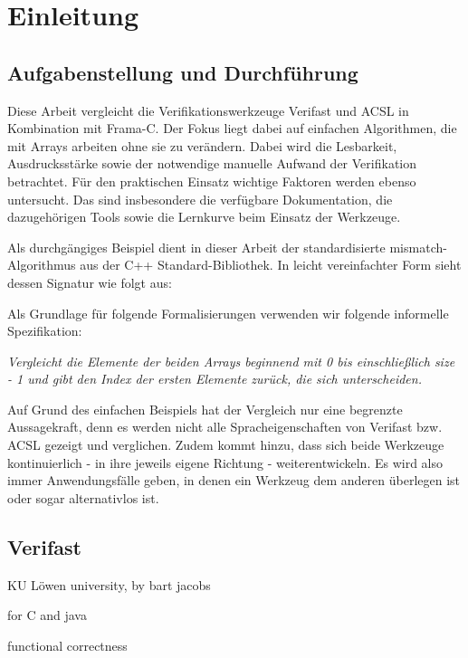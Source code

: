 ﻿\chapter{Einleitung}

\section{Aufgabenstellung und Durchführung}
Diese Arbeit vergleicht die Verifikationswerkzeuge Verifast und ACSL in Kombination mit Frama-C. 
Der Fokus liegt dabei auf einfachen Algorithmen, die mit Arrays arbeiten ohne sie zu verändern.
Dabei wird die Lesbarkeit, Ausdrucksstärke sowie der notwendige manuelle Aufwand der Verifikation betrachtet.
Für den praktischen Einsatz wichtige Faktoren werden ebenso untersucht. Das sind insbesondere die verfügbare 
Dokumentation, die dazugehörigen Tools sowie die Lernkurve beim Einsatz der Werkzeuge.

Als durchgängiges Beispiel dient in dieser Arbeit der standardisierte mismatch-Algorithmus aus
der C++ Standard-Bibliothek. In leicht vereinfachter Form sieht dessen Signatur wie folgt aus:



Als Grundlage für folgende Formalisierungen verwenden wir folgende informelle Spezifikation:

\emph{Vergleicht die Elemente der beiden Arrays beginnend mit 0 bis einschließlich size - 1 und gibt den
Index der ersten Elemente zurück, die sich unterscheiden.}

Auf Grund des einfachen Beispiels hat der Vergleich nur eine begrenzte Aussagekraft, denn es werden nicht alle
Spracheigenschaften von Verifast bzw. ACSL gezeigt und verglichen. Zudem kommt hinzu, dass sich beide Werkzeuge
kontinuierlich - in ihre jeweils eigene Richtung - weiterentwickeln. Es wird also immer Anwendungsfälle geben,
in denen ein Werkzeug dem anderen überlegen ist oder sogar alternativlos ist.



\section{Verifast}
\label{sec:verifast}

KU Löwen university, by bart jacobs


for C and java


functional correctness


